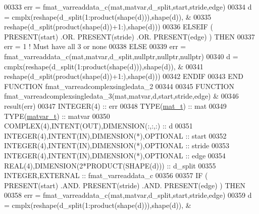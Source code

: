 \begin{DoxyCode}
00333         err = fmat\_varreaddata\_c(mat,matvar,d\_split,start,stride,edge)
00334         d = cmplx(reshape(d\_split(1:product(shape(d))),shape(d)),         &
00335                   reshape(d\_split(product(shape(d))+1:),shape(d)))
00336     \textcolor{keywordflow}{ELSEIF} ( \textcolor{keyword}{PRESENT}(start) .OR. \textcolor{keyword}{PRESENT}(stride) .OR. \textcolor{keyword}{PRESENT}(edge) ) \textcolor{keywordflow}{THEN}
00337         err = 1    \textcolor{comment}{! Must have all 3 or none}
00338     \textcolor{keywordflow}{ELSE}
00339         err = fmat\_varreaddata\_c(mat,matvar,d\_split,nullptr,nullptr,nullptr)
00340         d = cmplx(reshape(d\_split(1:product(shape(d))),shape(d)),         &
00341                   reshape(d\_split(product(shape(d))+1:),shape(d)))
00342 \textcolor{keywordflow}{    ENDIF}
00343 \textcolor{keyword}{END FUNCTION }fmat\_varreadcomplexsingledata\_2
00344 
00345 \textcolor{keyword}{FUNCTION }fmat\_varreadcomplexsingledata\_3(mat,matvar,d,start,stride,edge) &
00346                                                        result(err)
00347     \textcolor{keywordtype}{INTEGER(4)}                                  :: err
00348     \textcolor{keywordtype}{TYPE}(\hyperlink{group___m_a_t_gab0fc888f5a5d79943b16284b1f91c2e8}{mat\_t})                                 :: mat
00349     \textcolor{keywordtype}{TYPE}(\hyperlink{group___m_a_t_structmatvar__t}{matvar\_t})                              :: matvar
00350     \textcolor{keywordtype}{COMPLEX(4)},\textcolor{keywordtype}{INTENT(OUT)},\textcolor{keywordtype}{DIMENSION(:,:,:)} :: d
00351     \textcolor{keywordtype}{INTEGER(4)},\textcolor{keywordtype}{INTENT(IN)},\textcolor{keywordtype}{DIMENSION(*)},\textcolor{keywordtype}{OPTIONAL} :: start
00352     \textcolor{keywordtype}{INTEGER(4)},\textcolor{keywordtype}{INTENT(IN)},\textcolor{keywordtype}{DIMENSION(*)},\textcolor{keywordtype}{OPTIONAL} :: stride
00353     \textcolor{keywordtype}{INTEGER(4)},\textcolor{keywordtype}{INTENT(IN)},\textcolor{keywordtype}{DIMENSION(*)},\textcolor{keywordtype}{OPTIONAL} :: edge
00354     \textcolor{keywordtype}{REAL(4)},\textcolor{keywordtype}{DIMENSION(2*PRODUCT(SHAPE(d)))} :: d\_split
00355     \textcolor{keywordtype}{INTEGER},\textcolor{keywordtype}{EXTERNAL}                            :: fmat\_varreaddata\_c
00356 
00357     \textcolor{keywordflow}{IF} ( \textcolor{keyword}{PRESENT}(start) .AND. \textcolor{keyword}{PRESENT}(stride) .AND. \textcolor{keyword}{PRESENT}(edge) ) \textcolor{keywordflow}{THEN}
00358         err = fmat\_varreaddata\_c(mat,matvar,d\_split,start,stride,edge)
00359         d = cmplx(reshape(d\_split(1:product(shape(d))),shape(d)),         &

\end{DoxyCode}
